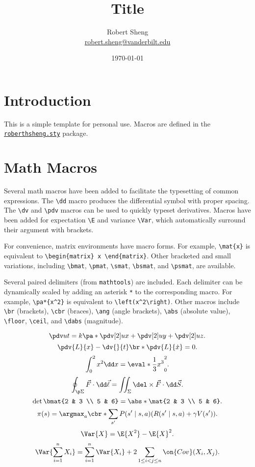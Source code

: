 \documentclass[11pt]{article}
\title{Title}
\author{Robert Sheng\\
\href{mailto:robert.sheng@vanderbilt.edu}{robert.sheng@vanderbilt.edu}}
\date{\today}
\begin{document}
\maketitle

\section{Introduction}
\label{sec:intro}
This is a simple template for personal use. Macros are defined in the \href{run:./roberthsheng.sty}{\texttt{roberthsheng.sty}} package.

\section{Math Macros}
Several math macros have been added to facilitate the typesetting of common expressions. The \verb|\dd| macro produces the differential symbol with proper spacing. The \verb|\dv| and \verb|\pdv| macros can be used to quickly typeset derivatives. Macros have been added for expectation \verb|\E| and variance \verb|\Var|, which automatically surround their argument with brackets.

For convenience, matrix environments have macro forms. For example, \verb|\mat{x}| is equivalent to \verb|\begin{matrix} x \end{matrix}|. Other bracketed and small variations, including \verb|\bmat|, \verb|\pmat|, \verb|\smat|, \verb|\bsmat|, and \verb|\psmat|, are available.

Several paired delimiters (from \verb|mathtools|) are included. Each delimiter can be dynamically scaled by adding an asterisk \verb|*| to the corresponding macro. For example, \verb|\pa*{x^2}| is equivalent to \verb|\left(x^2\right)|. Other macros include \verb|\br| (brackets), \verb|\cbr| (braces), \verb|\ang| (angle brackets), \verb|\abs| (absolute value), \verb|\floor|, \verb|\ceil|, and \verb|\dabs| (magnitude).

\[ \pdv ut = k\pa*{\pdv[2] ux + \pdv[2] uy + \pdv[2] uz}. \]
\[ \pdv{L}{x} - \dv{}{t}\br*{\pdv{L}{\dot x}} = 0. \]
\[ \int_0^2 x^2 \dd x = \eval*{\frac 13 x^3}_0^2. \]
\[ \oint_{\p\Sigma} \vec F \cdot \dd \vec\ell = \iint_{\Sigma} \del \times \vec F \cdot \dd \vec S. \]
\[ \det \bmat{2 & 3 \\ 5 & 6} = \abs*{\mat{2 & 3 \\ 5 & 6}}. \]
\[ \pi(s) = \argmax_a \cbr*{\sum_{s'} P(s' \mid s, a) (R(s' \mid s, a) + \gamma V(s'))}. \]
\[ \Var{X} = \E{X^2} - \E{X}^2. \]
\[ \Var{\sum_{i=1}^n X_i} = \sum_{i=1}^n \Var{X_i} + 2\sum_{1 \leq i < j \leq n} \on{Cov}(X_i, X_j). \]
\end{document}
